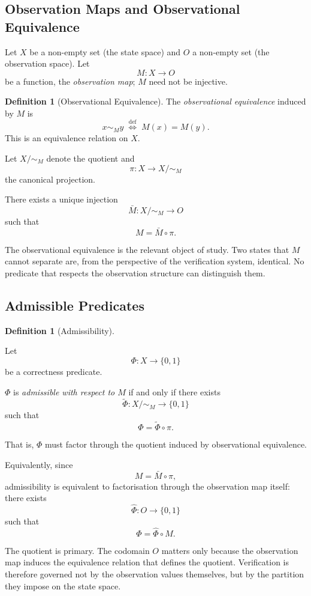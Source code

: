 \documentclass[12pt]{article}
\theoremstyle{plain}
\theoremstyle{definition}
\newtheorem{definition}[theorem]{Definition}
\theoremstyle{remark}
\begin{document}
\subsection{Observation Maps and Observational Equivalence}

Let $X$ be a non-empty set (the state space) and $O$ a non-empty set
(the observation space).
Let
\[
M : X \to O
\]
be a function, the \emph{observation map}; $M$ need not be injective.

\begin{definition}[Observational Equivalence]
The \emph{observational equivalence} induced by $M$ is
\[
x \sim_M y
\;\stackrel{\mathrm{def}}{\iff}\;
M(x) = M(y).
\]
This is an equivalence relation on $X$.

Let $X/{\sim_M}$ denote the quotient and
\[
\pi : X \to X/{\sim_M}
\]
the canonical projection.

There exists a unique injection
\[
\bar{M} : X/{\sim_M} \to O
\]
such that
\[
M = \bar{M} \circ \pi.
\]
\end{definition}

The observational equivalence is the relevant object of study.
Two states that $M$ cannot separate are, from the perspective of the
verification system, identical.
No predicate that respects the observation structure can distinguish
them.

\subsection{Admissible Predicates}

\begin{definition}[Admissibility]
\label{def:admissibility}

Let
\[
\Phi : X \to \{0,1\}
\]
be a correctness predicate.

$\Phi$ is \emph{admissible with respect to $M$} if and only if there
exists
\[
\widetilde{\Phi} : X/{\sim_M} \to \{0,1\}
\]
such that
\[
\Phi = \widetilde{\Phi} \circ \pi.
\]

That is, $\Phi$ must factor through the quotient induced by
observational equivalence.

Equivalently, since
\[
M = \bar{M} \circ \pi,
\]
admissibility is equivalent to factorisation through the observation
map itself: there exists
\[
\hat{\Phi} : O \to \{0,1\}
\]
such that
\[
\Phi = \hat{\Phi} \circ M.
\]
\end{definition}

The quotient is primary.
The codomain $O$ matters only because the observation map induces the
equivalence relation that defines the quotient.
Verification is therefore governed not by the observation values
themselves, but by the partition they impose on the state space.
\end{document}
